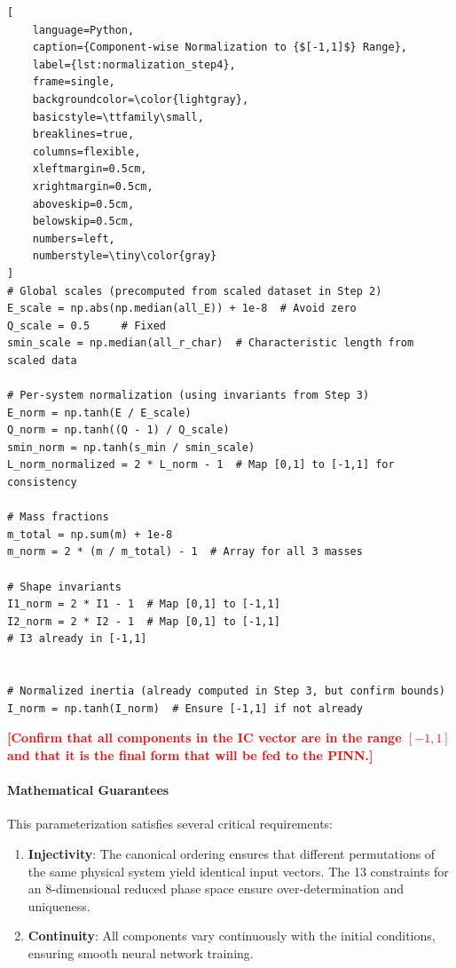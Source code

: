 \documentclass{article}
\newcommand{\authcomment}[1]{\textcolor{Red}{\textbf{[#1]}}}
\begin{document}
\begin{enumerate}
\begin{lstlisting}[
    language=Python,
    caption={Component-wise Normalization to {$[-1,1]$} Range},
    label={lst:normalization_step4},
    frame=single,
    backgroundcolor=\color{lightgray},
    basicstyle=\ttfamily\small,
    breaklines=true,
    columns=flexible,
    xleftmargin=0.5cm,
    xrightmargin=0.5cm,
    aboveskip=0.5cm,
    belowskip=0.5cm,
    numbers=left,
    numberstyle=\tiny\color{gray}
]
# Global scales (precomputed from scaled dataset in Step 2)
E_scale = np.abs(np.median(all_E)) + 1e-8  # Avoid zero
Q_scale = 0.5     # Fixed
smin_scale = np.median(all_r_char)  # Characteristic length from scaled data

# Per-system normalization (using invariants from Step 3)
E_norm = np.tanh(E / E_scale)
Q_norm = np.tanh((Q - 1) / Q_scale)
smin_norm = np.tanh(s_min / smin_scale)
L_norm_normalized = 2 * L_norm - 1  # Map [0,1] to [-1,1] for consistency

# Mass fractions
m_total = np.sum(m) + 1e-8
m_norm = 2 * (m / m_total) - 1  # Array for all 3 masses

# Shape invariants
I1_norm = 2 * I1 - 1  # Map [0,1] to [-1,1]
I2_norm = 2 * I2 - 1  # Map [0,1] to [-1,1]
# I3 already in [-1,1]


# Normalized inertia (already computed in Step 3, but confirm bounds)
I_norm = np.tanh(I_norm)  # Ensure [-1,1] if not already
\end{lstlisting}

    \authcomment{Confirm that all components in the IC vector are in the range $[-1,1]$ and that it is the final form that will be fed to the PINN.}

    \paragraph{Mathematical Guarantees} This parameterization satisfies several critical requirements:

    \begin{enumerate}
    \item \textbf{Injectivity}: The canonical ordering ensures that different permutations of the same physical system yield identical input vectors. The 13 constraints for an 8-dimensional reduced phase space ensure over-determination and uniqueness.

    \item \textbf{Continuity}: All components vary continuously with the initial conditions, ensuring smooth neural network training.


\end{enumerate}
\end{enumerate}
\end{document}
